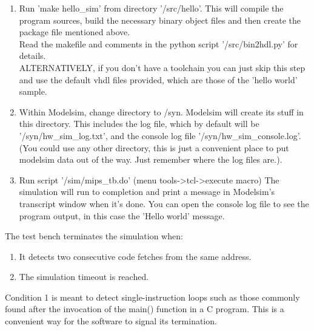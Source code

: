 \begin{enumerate}
    \item Run 'make hello\_sim' from directory '/src/hello'.
        This will compile the program sources, build the necessary binary object
        files and then create the package file mentioned above.\\
        Read the makefile and comments in the python script '/src/bin2hdl.py'
        for details.\\

        ALTERNATIVELY, if you don't have a toolchain you can just skip this
        step and use the default vhdl files provided, which are those of the
        'hello world' sample.\\

    \item Within Modelsim, change directory to /syn. Modelsim will create its 
        stuff in this directory. This includes the
        log file, which by default will be '/syn/hw\_sim\_log.txt', and the 
        console log file '/syn/hw\_sim\_console.log'.\\
        (You could use any other directory, this is just a convenient place to
        put modelsim data out of the way. Just remember where the log files
        are.).

    \item Run script '/sim/mips\_tb.do' (menu tools-\textgreater tcl-\textgreater execute macro)
        The simulation will run to completion and print a message in Modelsim's 
        transcript window when it's done. You can open the console log file 
        to see the program output, in this case the 'Hello world' message.\\

\end{enumerate}
    
    The test bench terminates the simulation when:
    
\begin{enumerate}
    
    \item It detects two consecutive code fetches from the same address.
    \item The simulation timeout is reached.
    
\end{enumerate}
    
    Condition 1 is meant to detect single-instruction loops such as those
    commonly found after the invocation of the main() function in a C program. 
    This is a convenient way for the software to signal its termination.\\
    
